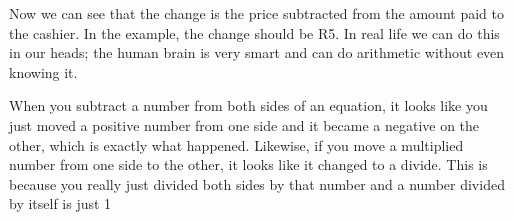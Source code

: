         \label{m38346*id176299}Now we can see that the change is the price subtracted from the amount paid
to the cashier. In the example, the change should be R5. In real life we
can do this in our heads; the human brain is very smart and can do arithmetic
without even knowing it.\par 
        \label{m38346*id176307}When you subtract a number from both sides of an equation, it looks like
you just moved a positive number from one side and it became a negative on the other,
which is exactly what happened. Likewise, if you move a multiplied number from
one side to the other, it looks like it changed to a divide. This is because you
really just divided both sides by that number and a number divided by itself is
just 1\par 
        \label{m38346*uid40}\nopagebreak\noindent{}
